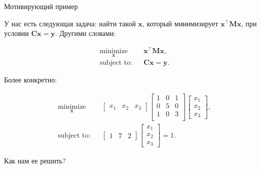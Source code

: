 \documentclass{beamer}
\begin{document}
\begin{frame}{Мотивирующий пример}
	\begin{flushleft}
		
		У нас есть следующая задача: найти такой $\mathbf x$, который минимизирует $\mathbf x^\top \mathbf M \mathbf x$, при условии $\mathbf C \mathbf x = \mathbf y$. Другими словами:
		
		\begin{equation} \label{eq:Example1:1}
			\begin{aligned}
				& \underset{\mathbf x}{\text{minimize}}
				& & \mathbf x^\top \mathbf M \mathbf x, \\
				& \text{subject to:}
				& & \mathbf C \mathbf x = \mathbf y.
			\end{aligned}
		\end{equation}
		
		Более конкретно:
		
		\begin{equation} \label{eq:Example1:2}
			\begin{aligned}
				& \underset{\mathbf x}{\text{minimize}}
				& & \begin{bmatrix} x_1 & x_2 & x_3 \end{bmatrix}
				\begin{bmatrix}
					1 & 0 & 1 \\
					0 & 5 & 0 \\
					1 & 0 & 3 \\
				\end{bmatrix}
				\begin{bmatrix} x_1 \\ x_2 \\ x_3 \end{bmatrix}, \\
				& \text{subject to:}
				& & \begin{bmatrix} 1 & 7 & 2 \end{bmatrix}
				\begin{bmatrix} x_1 \\ x_2 \\ x_3 \end{bmatrix}
				= 1.
			\end{aligned}
		\end{equation}
		
		Как нам ее решить?
		
	\end{flushleft}
\end{frame}
\end{document}
